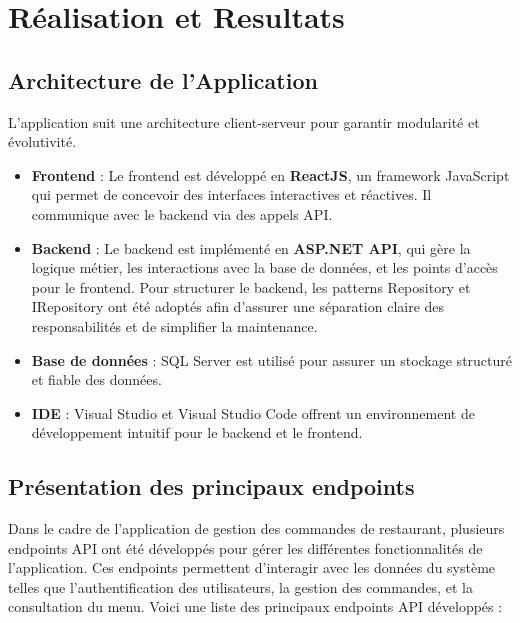 \chapter{Réalisation et Resultats}


\section{Architecture de l'Application}

L'application suit une architecture client-serveur pour garantir modularité et évolutivité.
\begin{itemize}
    \item \textbf{Frontend} :  
    Le frontend est développé en \textbf{ReactJS}, un framework JavaScript qui permet de concevoir des interfaces interactives et réactives. Il communique avec le backend via des appels API.

    \item \textbf{Backend} :  
    Le backend est implémenté en \textbf{ASP.NET API}, qui gère la logique métier, les interactions avec la base de données, et les points d’accès pour le frontend.  
    Pour structurer le backend, les patterns Repository et IRepository ont été adoptés afin d'assurer une séparation claire des responsabilités et de simplifier la maintenance.

    \item \textbf{Base de données} :  
    SQL Server est utilisé pour assurer un stockage structuré et fiable des données.

    \item \textbf{IDE} :  
    Visual Studio et Visual Studio Code offrent un environnement de développement intuitif pour le backend et le frontend.
\end{itemize}

\section{Présentation des principaux endpoints}

Dans le cadre de l’application de gestion des commandes de restaurant, plusieurs endpoints API ont été développés pour gérer les différentes fonctionnalités de l’application. Ces endpoints permettent d’interagir avec les données du système telles que l’authentification des utilisateurs, la gestion des commandes, et la consultation du menu. Voici une liste des principaux endpoints API développés :

